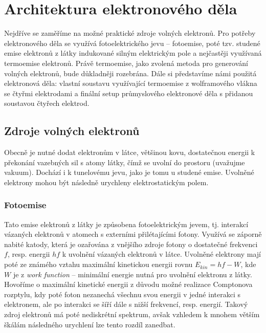 \newpage

\chapter{Architektura elektronového děla}
Nejdříve se zaměříme na možné praktické zdroje volných elektronů. Pro potřeby elektronového děla se využívá fotoelektrického jevu -- fotoemise, poté tzv. studené emise elektronů z látky indukované silným elektrickým pole a nejčastěji využívaná termoemise elektronů. Právě termoemise, jako zvolená metoda pro generování volných elektronů, bude důkladněji rozebrána. Dále si představíme námi použitá elektronová děla: vlastní soustavu využívající termoemise z wolframového vlákna se čtyřmi elektrodami a finální setup průmyslového elektronové děla s přidanou soustavou čtyřech elektrod.
\section{Zdroje volných elektronů}
Obecně je nutné dodat elektronům v látce, většinou kovu, dostatečnou energii k překonání vazebných sil s atomy látky, čímž se uvolní do prostoru (uvažujme vakuum). Dochází i k tunelovému jevu, jako je tomu u studené emise. Uvolněné elektrony mohou být následně urychleny elektrostatickým polem.
\subsection{Fotoemise} Tato emise elektronů z látky je způsobena fotoelektrickým jevem, tj. interakcí vázaných elektronů v atomech s externími přilétajícími fotony. Využívá se záporně nabité katody, která je ozařována z vnějšího zdroje fotony o dostatečné frekvenci $f$, resp. energii $hf$ k uvolnění vázaných elektronů v látce. Uvolněné elektrony mají poté ze známého vztahu maximální kinetickou energii rovnu $E_{kin}=hf-W$, kde $W$ je z \textit{work function} -- minimální energie nutná pro uvolnění elektronu z látky. Hovoříme o maximální kinetické energii z důvodu možné realizace Comptonova rozptylu, kdy poté foton nezanechá všechnu svou energii v jedné interakci s elektronem, ale po interakci se šíří dále s nižší frekvencí, resp. energií. Takový zdroj elektronů má poté nediskrétní spektrum, avšak vzhledem k mnohem větším škálám následného urychlení lze tento rozdíl zanedbat. 
